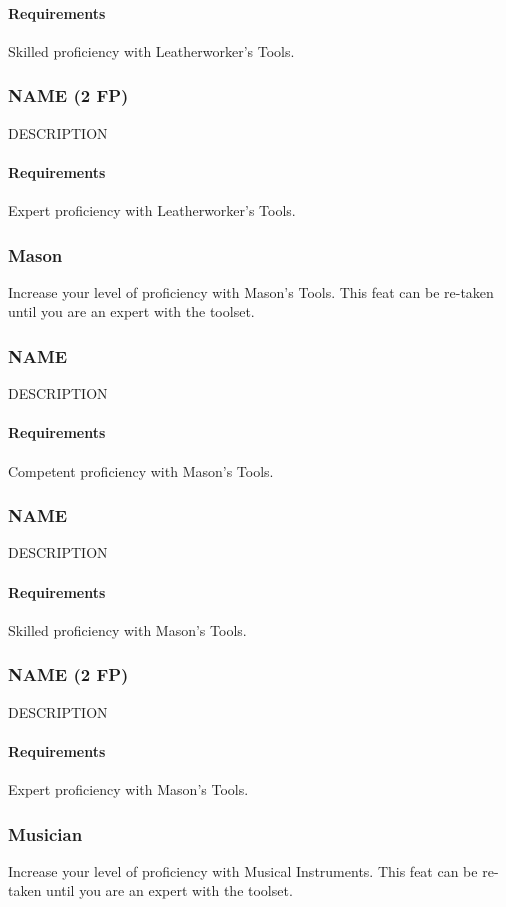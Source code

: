    \paragraph{Requirements} Skilled proficiency with Leatherworker's Tools.
\subsubsection{NAME (2 FP)} \label{feat::name}
    DESCRIPTION
    \paragraph{Requirements} Expert proficiency with Leatherworker's Tools.
\subsubsection{Mason} \label{feat::mason}
    Increase your level of proficiency with Mason's Tools.
    This feat can be re-taken until you are an expert with the toolset.
\subsubsection{NAME} \label{feat::name}
    DESCRIPTION
    \paragraph{Requirements} Competent proficiency with Mason's Tools.
\subsubsection{NAME} \label{feat::name}
    DESCRIPTION
    \paragraph{Requirements} Skilled proficiency with Mason's Tools.
\subsubsection{NAME (2 FP)} \label{feat::name}
    DESCRIPTION
    \paragraph{Requirements} Expert proficiency with Mason's Tools.
\subsubsection{Musician} \label{feat::musician}
    Increase your level of proficiency with Musical Instruments.
    This feat can be re-taken until you are an expert with the toolset.

